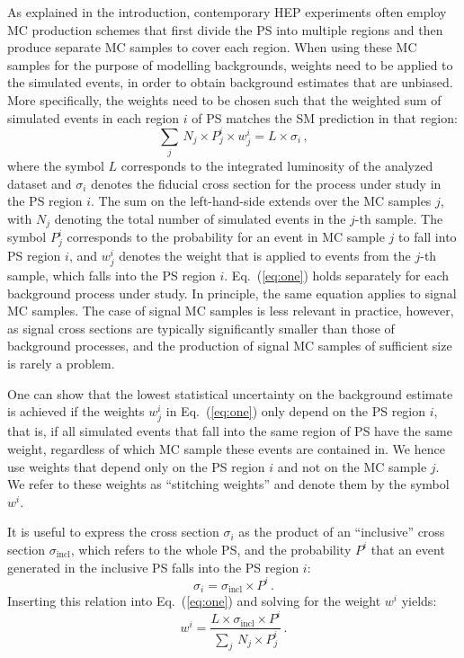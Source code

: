 \documentclass[twocolumn,epjc3]{svjour3}
\newcommand{\incl}{\ensuremath{\textrm{incl}}\xspace}
\begin{document}
As explained in the introduction,
contemporary HEP experiments often employ MC production schemes
that first divide the PS into multiple regions and then produce separate MC samples to cover each region.
When using these MC samples for the purpose of modelling backgrounds,
weights need to be applied to the simulated events, in order to obtain background estimates that are unbiased.
More specifically, the weights need to be chosen such that the weighted sum of simulated events in each region $i$ of PS 
matches the SM prediction in that region:
\begin{equation}
\sum_{j} \, N_{j} \times P_{j}^{i} \times w_{j}^{i} = L \times \sigma_{i} \, ,
\label{eq:one}
\end{equation}
where the symbol $L$ corresponds to the integrated luminosity of the analyzed dataset
and $\sigma_{i}$ denotes the fiducial cross section for the process under study in the PS region $i$.
The sum on the left-hand-side extends over the MC samples $j$,
with $N_{j}$ denoting the total number of simulated events in the $j$-th sample.
The symbol $P_{j}^{i}$ corresponds to the probability for an event in MC sample $j$ to fall into PS region $i$,
and $w_{j}^{i}$ denotes the weight that is applied to events from the $j$-th sample,
which falls into the PS region $i$.
Eq.~(\ref{eq:one}) holds separately for each background process under study.
In principle, the same equation applies to signal MC samples. 
The case of signal MC samples is less relevant in practice, however,
as signal cross sections are typically significantly smaller than those of background processes,
and the production of signal MC samples of sufficient size is rarely a problem.

One can show that the lowest statistical uncertainty on the background estimate is achieved 
if the weights $w_{j}^{i}$ in Eq.~(\ref{eq:one}) only depend on the PS region $i$,
that is, if all simulated events that fall into the same region of PS have the same weight,
regardless of which MC sample these events are contained in.
We hence use weights that depend only on the PS region $i$ and not on the MC sample $j$.
We refer to these weights as ``stitching weights'' and denote them by the symbol $w^{i}$.

It is useful to express the cross section $\sigma_{i}$ as the product of an ``inclusive'' cross section $\sigma_{\incl}$,
which refers to the whole PS, and the probability $P^{i}$ that an event generated in the inclusive PS falls into the PS region $i$:
\begin{equation*}
\sigma_{i} = \sigma_{\incl} \times P^{i} \, .
\label{eq:two}
\end{equation*}
Inserting this relation into Eq.~(\ref{eq:one}) and solving for the weight $w^{i}$ yields:
\begin{equation}
w^{i} = \frac{L \times \sigma_{\incl} \times P^{i}}{\sum_{j} \, N_{j} \times P_{j}^{i}} \, .
\label{eq:master}
\end{equation}
\end{document}
